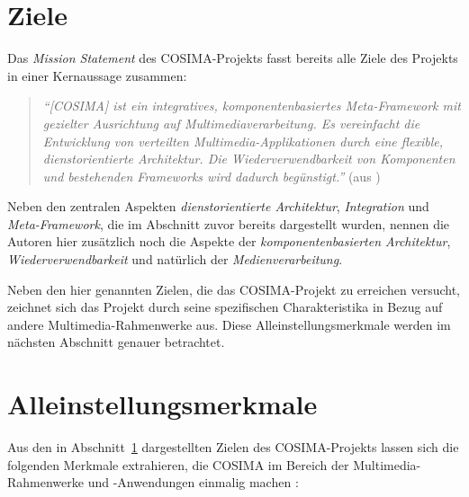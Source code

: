   
\section{Ziele} %
\label{sec:ziele_cosima}

  Das \emph{Mission Statement} des COSIMA-Projekts fasst bereits alle Ziele des Projekts in einer Kernaussage zusammen:

  \begin{quote}
    \emph{``[COSIMA] ist ein integratives, komponentenbasiertes Meta-Framework mit gezielter Ausrichtung auf Multimediaverarbeitung. Es vereinfacht die Entwicklung von verteilten Multimedia-Applikationen durch eine flexible, dienstorientierte Architektur. Die Wiederverwendbarkeit von Komponenten und bestehenden Frameworks wird dadurch begünstigt.''} (aus \citep[S. 2]{bericht})
  \end{quote}

  Neben den zentralen Aspekten \emph{dienstorientierte Architektur}, \emph{Integration} und \emph{Meta-Framework}, die im Abschnitt zuvor bereits dargestellt wurden, nennen die Autoren hier zusätzlich noch die Aspekte der \emph{komponentenbasierten Architektur}, \emph{Wiederverwendbarkeit} und natürlich der \emph{Medienverarbeitung}.
  
  Neben den hier genannten Zielen, die das COSIMA-Projekt zu erreichen versucht, zeichnet sich das Projekt durch seine spezifischen Charakteristika in Bezug auf andere Multimedia-Rahmenwerke aus. Diese Alleinstellungsmerkmale werden im nächsten Abschnitt genauer betrachtet.


\section{Alleinstellungsmerkmale} %
\label{sec:alleinstellungsmerkmale}

  Aus den in Abschnitt~\ref{sec:ziele_cosima} dargestellten Zielen des COSIMA-Projekts lassen sich die folgenden Merkmale extrahieren, die COSIMA im Bereich der Multimedia-Rahmenwerke und -Anwendungen einmalig machen \citep[S. 3f]{bericht}:
  
